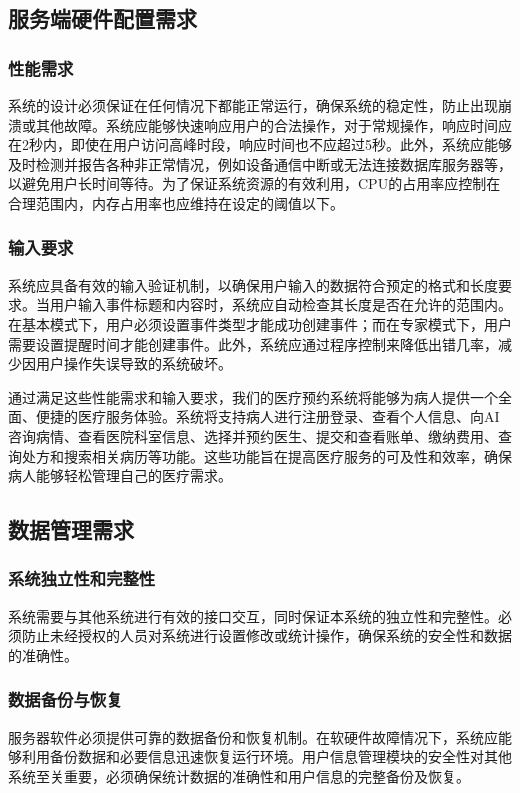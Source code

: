 \subsection{服务端硬件配置需求}
\subsubsection{性能需求}
系统的设计必须保证在任何情况下都能正常运行，确保系统的稳定性，防止出现崩溃或其他故障。系统应能够快速响应用户的合法操作，对于常规操作，响应时间应在2秒内，即使在用户访问高峰时段，响应时间也不应超过5秒。此外，系统应能够及时检测并报告各种非正常情况，例如设备通信中断或无法连接数据库服务器等，以避免用户长时间等待。为了保证系统资源的有效利用，CPU的占用率应控制在合理范围内，内存占用率也应维持在设定的阈值以下。

\subsubsection{输入要求}
系统应具备有效的输入验证机制，以确保用户输入的数据符合预定的格式和长度要求。当用户输入事件标题和内容时，系统应自动检查其长度是否在允许的范围内。在基本模式下，用户必须设置事件类型才能成功创建事件；而在专家模式下，用户需要设置提醒时间才能创建事件。此外，系统应通过程序控制来降低出错几率，减少因用户操作失误导致的系统破坏。

通过满足这些性能需求和输入要求，我们的医疗预约系统将能够为病人提供一个全面、便捷的医疗服务体验。系统将支持病人进行注册登录、查看个人信息、向AI咨询病情、查看医院科室信息、选择并预约医生、提交和查看账单、缴纳费用、查询处方和搜索相关病历等功能。这些功能旨在提高医疗服务的可及性和效率，确保病人能够轻松管理自己的医疗需求。

\subsection{数据管理需求}
\subsubsection{系统独立性和完整性}
系统需要与其他系统进行有效的接口交互，同时保证本系统的独立性和完整性。必须防止未经授权的人员对系统进行设置修改或统计操作，确保系统的安全性和数据的准确性。

\subsubsection{数据备份与恢复}
服务器软件必须提供可靠的数据备份和恢复机制。在软硬件故障情况下，系统应能够利用备份数据和必要信息迅速恢复运行环境。用户信息管理模块的安全性对其他系统至关重要，必须确保统计数据的准确性和用户信息的完整备份及恢复。

